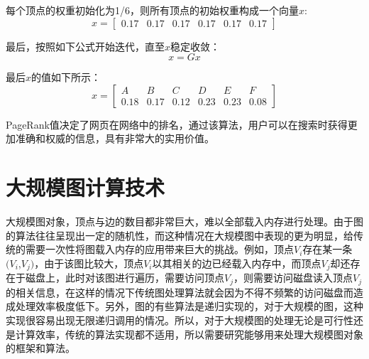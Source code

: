 每个顶点的权重初始化为1/6，则所有顶点的初始权重构成一个向量$x$:
\[x = \left[ {\begin{array}{*{20}{c}}
{0.17}&{0.17}&{0.17}&{0.17}&{0.17}&{0.17}
\end{array}} \right]\]

最后，按照如下公式开始迭代，直至$x$稳定收敛：
\[x = Gx\]

最后$x$的值如下所示：
\[x = \left[ {\begin{array}{*{20}{c}}
A&B&C&D&E&F\\
{0.18}&{0.17}&{0.12}&{0.23}&{0.23}&{0.08}
\end{array}} \right]\]

PageRank值决定了网页在网络中的排名，通过该算法，用户可以在搜索时获得更加准确和权威的信息，具有非常大的实用价值。

\section{大规模图计算技术}

大规模图对象，顶点与边的数目都非常巨大，难以全部载入内存进行处理。由于图的算法往往呈现出一定的随机性，而这种情况在大规模图中表现的更为明显，给传统的需要一次性将图载入内存的应用带来巨大的挑战。例如，顶点$V_i$存在某一条$(V_i$,$V_j)$，由于该图比较大，顶点$V_i$以其相关的边已经载入内存中，而顶点$V_j$却还存在于磁盘上，此时对该图进行遍历，需要访问顶点$V_j$，则需要访问磁盘读入顶点$V_j$的相关信息，在这样的情况下传统图处理算法就会因为不得不频繁的访问磁盘而造成处理效率极度低下。另外，图的有些算法是递归实现的，对于大规模的图，这种实现很容易出现无限递归调用的情况。所以，对于大规模图的处理无论是可行性还是计算效率，传统的算法实现都不适用，所以需要研究能够用来处理大规模图对象的框架和算法。

